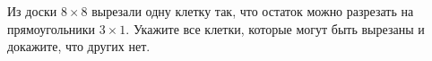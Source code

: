 Из доски $8 \times 8$ вырезали одну клетку так, что остаток можно разрезать на прямоугольники $3 \times 1$. Укажите все клетки, которые могут быть вырезаны и докажите, что других нет.